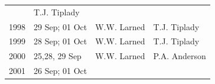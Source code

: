 \documentclass[]{article}
\begin{document}
\begin{longtable}[]{@{}llll@{}}
\begin{minipage}[t]{0.18\columnwidth}
\end{minipage} & \begin{minipage}[t]{0.20\columnwidth}\raggedright\strut
T.J. Tiplady\strut
\end{minipage}\tabularnewline
\begin{minipage}[t]{0.12\columnwidth}\raggedright\strut
1998\strut
\end{minipage} & \begin{minipage}[t]{0.38\columnwidth}\raggedright\strut
29 Sep; 01 Oct\strut
\end{minipage} & \begin{minipage}[t]{0.18\columnwidth}\raggedright\strut
W.W. Larned\strut
\end{minipage} & \begin{minipage}[t]{0.20\columnwidth}\raggedright\strut
T.J. Tiplady\strut
\end{minipage}\tabularnewline
\begin{minipage}[t]{0.12\columnwidth}\raggedright\strut
1999\strut
\end{minipage} & \begin{minipage}[t]{0.38\columnwidth}\raggedright\strut
28 Sep; 01 Oct\strut
\end{minipage} & \begin{minipage}[t]{0.18\columnwidth}\raggedright\strut
W.W. Larned\strut
\end{minipage} & \begin{minipage}[t]{0.20\columnwidth}\raggedright\strut
T.J. Tiplady\strut
\end{minipage}\tabularnewline
\begin{minipage}[t]{0.12\columnwidth}\raggedright\strut
2000\strut
\end{minipage} & \begin{minipage}[t]{0.38\columnwidth}\raggedright\strut
25,28, 29 Sep\strut
\end{minipage} & \begin{minipage}[t]{0.18\columnwidth}\raggedright\strut
W.W. Larned\strut
\end{minipage} & \begin{minipage}[t]{0.20\columnwidth}\raggedright\strut
P.A. Anderson\strut
\end{minipage}\tabularnewline
\begin{minipage}[t]{0.12\columnwidth}\raggedright\strut
2001\strut
\end{minipage} & \begin{minipage}[t]{0.38\columnwidth}\raggedright\strut
26 Sep; 01 Oct\strut

\end{minipage}
\end{longtable}
\end{document}
